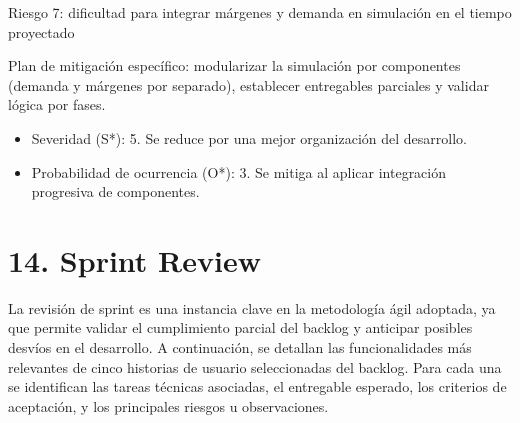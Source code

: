 \documentclass[
11pt, %
]{charter}
\begin{document}
Riesgo 7: dificultad para integrar márgenes y demanda en simulación en el tiempo proyectado

Plan de mitigación específico: modularizar la simulación por componentes (demanda y márgenes por separado), establecer entregables parciales y validar lógica por fases.
\begin{itemize}
	\item Severidad (S*): 5. Se reduce por una mejor organización del desarrollo.
	\item Probabilidad de ocurrencia (O*): 3. Se mitiga al aplicar integración progresiva de componentes.
\end{itemize}

\newpage

\section{14. Sprint Review}
\label{sec:sprint_review}

La revisión de sprint es una instancia clave en la metodología ágil adoptada, ya que permite validar el cumplimiento parcial del backlog y anticipar posibles desvíos en el desarrollo. A continuación, se detallan las funcionalidades más relevantes de cinco historias de usuario seleccionadas del backlog. Para cada una se identifican las tareas técnicas asociadas, el entregable esperado, los criterios de aceptación, y los principales riesgos u observaciones.
\end{document}
